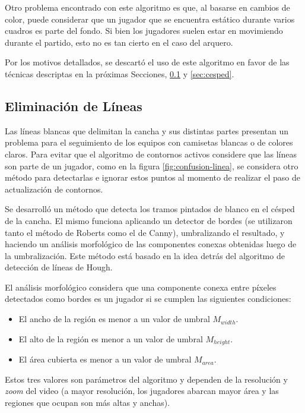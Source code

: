 Otro problema encontrado con este algoritmo es que, al basarse en cambios de color,
puede considerar que un jugador que se encuentra estático durante varios cuadros
es parte del fondo. Si bien los jugadores suelen estar en movimiendo durante el
partido, esto no es tan cierto en el caso del arquero.

Por los motivos detallados, se descartó el uso de este algoritmo en favor de las
técnicas descriptas en la próximas Secciones, \ref{sec:lineas} y \ref{sec:cesped}.

\subsection{Eliminación de Líneas}
\label{sec:lineas}

Las líneas blancas que delimitan la cancha y sus distintas partes presentan un
problema para el seguimiento de los equipos con camisetas blancas o de colores
claros. Para evitar que el algoritmo de contornos activos considere que las
líneas son parte de un jugador, como en la figura \ref{fig:confusion-linea}, se
considera otro método para detectarlas e ignorar estos puntos al momento de
realizar el paso de actualización de contornos.

Se desarrolló un método que detecta los tramos pintados de blanco en el césped
de la cancha. El mismo funciona aplicando un detector de bordes (se utilizaron
tanto el método de Roberts como el de Canny), umbralizando el resultado, y
haciendo un análisis morfológico de las componentes conexas obtenidas luego de
la umbralización. Este método está basado en la idea detrás del algoritmo de
detección de líneas de Hough.

El análisis morfológico considera que una componente conexa entre píxeles
detectados como bordes es un jugador si se cumplen las siguientes condiciones:
\begin{itemize}
  \item El ancho de la región es menor a un valor de umbral $M_{width}$.
  \item El alto de la región es menor a un valor de umbral $M_{height}$.
  \item El área cubierta es menor a un valor de umbral $M_{area}$.
\end{itemize}

Estos tres valores son parámetros del algoritmo y dependen de la resolución y
\textit{zoom} del video (a mayor resolución, los jugadores abarcan mayor área y
las regiones que ocupan son más altas y anchas).

